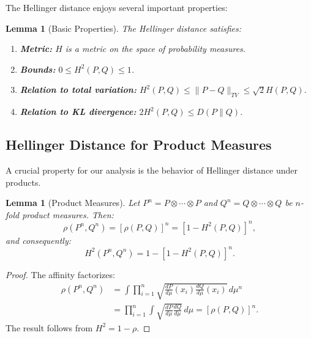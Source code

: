 \documentclass[preprint,review,12pt]{article}
\newtheorem{lemma}[theorem]{Lemma}
\begin{document}
The Hellinger distance enjoys several important properties:

\begin{lemma}[Basic Properties]\label{lem:basic_properties}
The Hellinger distance satisfies:
\begin{enumerate}[label=(\roman*)]
	\item \textbf{Metric:} $H$ is a metric on the space of probability measures.
	\item \textbf{Bounds:} $0 \leq H^2(P, Q) \leq 1$.
	\item \textbf{Relation to total variation:} $H^2(P,Q) \leq \|P - Q\|_{TV} \leq \sqrt{2} H(P,Q)$.
	\item \textbf{Relation to KL divergence:} $2H^2(P, Q) \leq D(P \| Q)$.
\end{enumerate}
\end{lemma}

\subsection{Hellinger Distance for Product Measures}

A crucial property for our analysis is the behavior of Hellinger distance 
under products.

\begin{lemma}[Product Measures]\label{lem:product_measures}
Let $P^n = P \otimes \cdots \otimes P$ and $Q^n = Q \otimes \cdots \otimes Q$ 
be $n$-fold product measures. Then:
\begin{equation}\label{eq:product_affinity}
	\rho(P^n, Q^n) = [\rho(P, Q)]^n = [1 - H^2(P, Q)]^n,
\end{equation}
and consequently:
\begin{equation}\label{eq:product_hellinger}
	H^2(P^n, Q^n) = 1 - [1 - H^2(P, Q)]^n.
\end{equation}
\end{lemma}

\begin{proof}
The affinity factorizes:
\begin{align*}
	\rho(P^n, Q^n) &= \int \prod_{i=1}^n \sqrt{\frac{dP}{d\mu}(x_i) 
		\frac{dQ}{d\mu}(x_i)} \, d\mu^n \\
	&= \prod_{i=1}^n \int \sqrt{\frac{dP}{d\mu} \frac{dQ}{d\mu}} \, d\mu 
	= [\rho(P,Q)]^n.
\end{align*}
The result follows from $H^2 = 1 - \rho$.
\end{proof}
\end{document}
